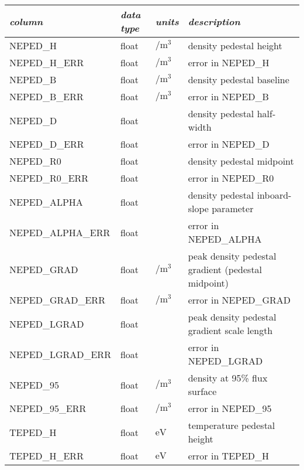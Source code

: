 \begin{table*}[h]
 \pushtooutside
 {\begin{tabu} to 143mm {X[2.348,l]X[1,c]X[1,c]X[4.348,c]}
   \toprule
   \emph{column} &
   \emph{data type} &
   \emph{units} &
   \emph{description}
   \\
   \midrule
   NEPED\_H &
   float &
   $\si{\per\meter\cubed}$ &
   density pedestal height
   \\
   NEPED\_H\_ERR &
   float &
   $\si{\per\meter\cubed}$ &
   error in NEPED\_H
   \\
   NEPED\_B &
   float &
   $\si{\per\meter\cubed}$ &
   density pedestal baseline
   \\
   NEPED\_B\_ERR &
   float &
   $\si{\per\meter\cubed}$ &
   error in NEPED\_B
   \\
   NEPED\_D &
   float &
   &
   density pedestal half-width
   \\
   NEPED\_D\_ERR &
   float &
   &
   error in NEPED\_D
   \\
   NEPED\_R0 &
   float &
   &
   density pedestal midpoint
   \\
   NEPED\_R0\_ERR &
   float &
   &
   error in NEPED\_R0
   \\
   NEPED\_ALPHA &
   float &
   &
   density pedestal inboard-slope parameter
   \\
   NEPED\_ALPHA\_ERR &
   float &
   &
   error in NEPED\_ALPHA
   \\
   NEPED\_GRAD &
   float &
   $\si{\per\meter\cubed}$ &
   peak density pedestal gradient (pedestal midpoint)
   \\
   NEPED\_GRAD\_ERR &
   float &
   $\si{\per\meter\cubed}$ &
   error in NEPED\_GRAD
   \\
   NEPED\_LGRAD &
   float &
   &
   peak density pedestal gradient scale length
   \\
   NEPED\_LGRAD\_ERR &
   float &
   &
   error in NEPED\_LGRAD
   \\
   NEPED\_95 &
   float &
   $\si{\per\meter\cubed}$ &
   density at 95\% flux surface
   \\
   NEPED\_95\_ERR &
   float &
   $\si{\per\meter\cubed}$ &
   error in NEPED\_95
   \\
   TEPED\_H &
   float &
   $\si{\electronvolt}$ &
   temperature pedestal height
   \\
   TEPED\_H\_ERR &
   float &
   $\si{\electronvolt}$ &
   error in TEPED\_H
   \\

\end{tabu}}
\end{table*}
